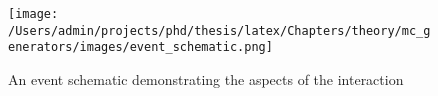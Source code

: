 \begin{figure}[h]
	\texttt{[image: /Users/admin/projects/phd/thesis/latex/Chapters/theory/mc\_generators/images/event\_schematic.png]}
	\caption{An event schematic demonstrating the aspects of the interaction \cite{Field:2002vt}}
	\label{fig: event schematic}
\end{figure}


%







%
	
